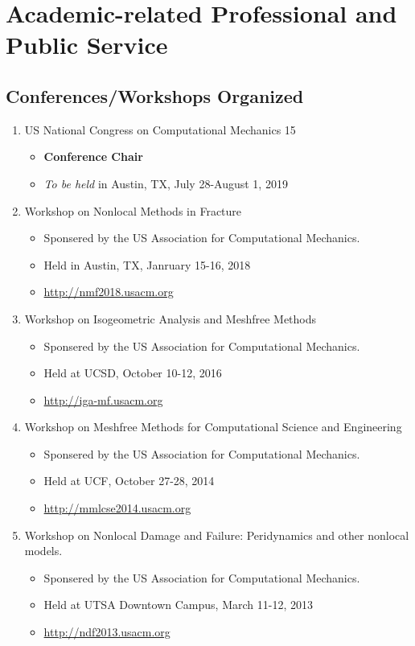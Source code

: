 \section*{Academic-related Professional and Public Service}

\subsection*{Conferences/Workshops Organized}
  \begin{enumerate}
      \item US National Congress on Computational Mechanics 15
          \begin{itemize}
             \item {\bf Conference Chair}
             \item \emph{To be held} in Austin, TX, July 28-August 1, 2019
          \end{itemize}
      \item Workshop on Nonlocal Methods in Fracture
          \begin{itemize}
             \item Sponsered by the US Association for Computational Mechanics.
             \item Held in Austin, TX, Janruary 15-16, 2018
             \item \url{http://nmf2018.usacm.org}
          \end{itemize}
      \item Workshop on Isogeometric Analysis and Meshfree Methods
          \begin{itemize}
             \item Sponsered by the US Association for Computational Mechanics.
             \item Held at UCSD, October 10-12, 2016
             \item \url{http://iga-mf.usacm.org}
          \end{itemize}
      \item Workshop on Meshfree Methods for Computational Science and Engineering
          \begin{itemize}
             \item Sponsered by the US Association for Computational Mechanics.
             \item Held at UCF, October 27-28, 2014
             \item \url{http://mmlcse2014.usacm.org}
          \end{itemize}
      \item Workshop on Nonlocal Damage and Failure: Peridynamics and other nonlocal models.  
          \begin{itemize}
             \item Sponsered by the US Association for Computational Mechanics.
             \item Held at UTSA Downtown Campus, March 11-12, 2013
             \item \url{http://ndf2013.usacm.org}
          \end{itemize}
  \end{enumerate}

